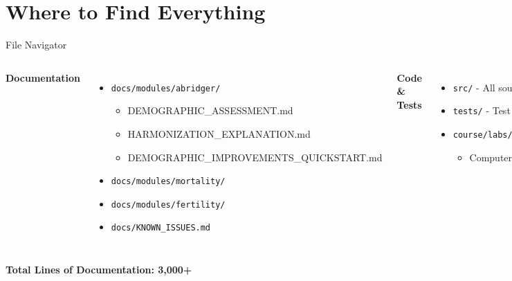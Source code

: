 \documentclass[aspectratio=169]{beamer}
\begin{document}
\section{Where to Find Everything}

\begin{frame}{File Navigator}
\begin{columns}
\textbf{Documentation}
\begin{itemize}
    \item \texttt{docs/modules/abridger/}
    \begin{itemize}
        \scriptsize
        \item DEMOGRAPHIC\_ASSESSMENT.md
        \item HARMONIZATION\_EXPLANATION.md
        \item DEMOGRAPHIC\_IMPROVEMENTS\_QUICKSTART.md
    \end{itemize}
    \item \texttt{docs/modules/mortality/}
    \item \texttt{docs/modules/fertility/}
    \item \texttt{docs/KNOWN\_ISSUES.md}
\end{itemize}

\textbf{Code \& Tests}
\begin{itemize}
    \item \texttt{src/} - All source modules
    \item \texttt{tests/} - Test suite
    \item \texttt{course/labs/solutions/}
    \begin{itemize}
        \scriptsize
        \item Computer\_Lab\_4\_in\_class.py
    \end{itemize}
\end{itemize}

\vspace{0.3cm}

\textbf{Issue Tracking}
\begin{itemize}
    \item \texttt{.github\_issue\_infant\_adjustment.md}
\end{itemize}
\end{columns}

\vspace{0.5cm}

\begin{center}
\Large
\textbf{Total Lines of Documentation: 3,000+}
\end{center}
\end{frame}
\end{document}
